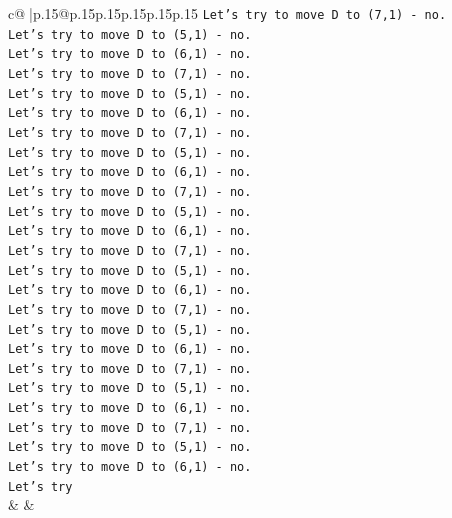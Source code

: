 \documentclass{article}
\begin{document}
{\begin{supertabular}{c@{$\;$}|p{.15\linewidth}@{}p{.15\linewidth}p{.15\linewidth}p{.15\linewidth}p{.15\linewidth}p{.15\linewidth}}
{{{\texttt{Let's try to move D to (7,1) {-} no.} \\
\texttt{Let's try to move D to (5,1) {-} no.} \\
\texttt{Let's try to move D to (6,1) {-} no.} \\
\texttt{Let's try to move D to (7,1) {-} no.} \\
\texttt{Let's try to move D to (5,1) {-} no.} \\
\texttt{Let's try to move D to (6,1) {-} no.} \\
\texttt{Let's try to move D to (7,1) {-} no.} \\
\texttt{Let's try to move D to (5,1) {-} no.} \\
\texttt{Let's try to move D to (6,1) {-} no.} \\
\texttt{Let's try to move D to (7,1) {-} no.} \\
\texttt{Let's try to move D to (5,1) {-} no.} \\
\texttt{Let's try to move D to (6,1) {-} no.} \\
\texttt{Let's try to move D to (7,1) {-} no.} \\
\texttt{Let's try to move D to (5,1) {-} no.} \\
\texttt{Let's try to move D to (6,1) {-} no.} \\
\texttt{Let's try to move D to (7,1) {-} no.} \\
\texttt{Let's try to move D to (5,1) {-} no.} \\
\texttt{Let's try to move D to (6,1) {-} no.} \\
\texttt{Let's try to move D to (7,1) {-} no.} \\
\texttt{Let's try to move D to (5,1) {-} no.} \\
\texttt{Let's try to move D to (6,1) {-} no.} \\
\texttt{Let's try to move D to (7,1) {-} no.} \\
\texttt{Let's try to move D to (5,1) {-} no.} \\
\texttt{Let's try to move D to (6,1) {-} no.} \\
\texttt{Let's try} \\
            }
        }
    }
    & & \\ \\


\end{supertabular}}
\end{document}
